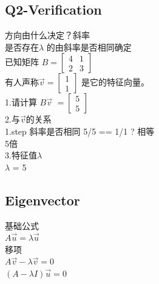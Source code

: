 \documentclass[12pt]{article}
\begin{document}
\subsection{Q2-Verification}
\begin{flushleft}
方向由什么决定？斜率 \\
是否存在$\lambda$ 的由斜率是否相同确定 \\
已知矩阵 $B = \begin{bmatrix}
    4 & 1 \\
    2 & 3
\end{bmatrix}$ \\ 
有人声称$\vec{v} = \begin{bmatrix}
    1 \\
    1
\end{bmatrix}$ 是它的特征向量。\\ 

1.请计算 $B\vec{v}$
$
= \begin{bmatrix}
    5 \\
    5
\end{bmatrix}
$ \\
2.与$\vec{v}的关系$ \\
1.step
斜率是否相同 5/5 == 1/1 ?
相等\\
5倍 \\

3.特征值$\lambda$ \\
$\lambda$ = 5
\end{flushleft}

\subsection*{Eigenvector}
\begin{flushleft}
基础公式 \\
$A\vec{u} = \lambda \vec{u}$ \\ 
移项 \\
$A\vec{v} - \lambda \vec{v} = 0$ \\ 
$(A - \lambda I)\vec{u} = 0$

\end{flushleft}
\end{document}
